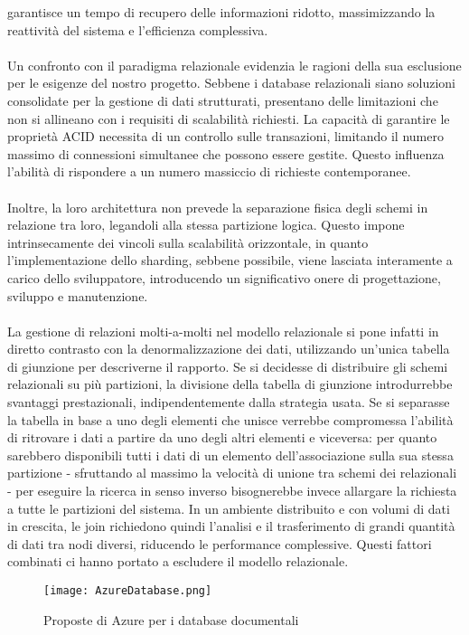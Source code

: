 garantisce un tempo di recupero delle informazioni ridotto,
massimizzando la reattività del sistema e l'efficienza complessiva.\\
\\
Un confronto con il paradigma relazionale evidenzia le ragioni
della sua esclusione per le esigenze del nostro progetto.
Sebbene i database relazionali siano soluzioni consolidate per la gestione di dati strutturati,
presentano delle limitazioni che non si allineano con i requisiti di scalabilità richiesti.
La capacità di garantire le proprietà ACID necessita 
di un controllo sulle transazioni,
limitando il numero massimo di connessioni simultanee che possono essere gestite.
Questo influenza l'abilità di rispondere a un numero massiccio di richieste contemporanee.\\
\\
Inoltre, la loro architettura non prevede la separazione fisica degli schemi in relazione tra loro,
legandoli alla stessa partizione logica.
Questo impone intrinsecamente dei vincoli sulla scalabilità orizzontale,
in quanto l'implementazione dello sharding, sebbene possibile,
viene lasciata interamente a carico dello sviluppatore,
introducendo un significativo onere di progettazione, sviluppo e manutenzione.\\
\\
La gestione di relazioni molti-a-molti nel modello relazionale
si pone infatti in diretto contrasto con la denormalizzazione dei dati,
utilizzando un'unica tabella di giunzione per descriverne il rapporto.
Se si decidesse di distribuire gli schemi relazionali su più partizioni,
la divisione della tabella di giunzione introdurrebbe svantaggi prestazionali,
indipendentemente dalla strategia usata.
Se si separasse la tabella in base a uno degli elementi che unisce
verrebbe compromessa l'abilità di ritrovare i dati a partire 
da uno degli altri elementi e viceversa:
per quanto sarebbero disponibili tutti i dati di un elemento 
dell'associazione sulla sua stessa partizione
- sfruttando al massimo la velocità di unione tra schemi dei relazionali -
per eseguire la ricerca in senso inverso bisognerebbe invece
allargare la richiesta a tutte le partizioni del sistema.
In un ambiente distribuito e con volumi di dati in crescita,
le join richiedono quindi l'analisi e il trasferimento di grandi quantità di dati tra nodi diversi,
riducendo le performance complessive.
Questi fattori combinati ci hanno portato a escludere il modello relazionale.\\
\begin{figure}[h!]
    \centering
    \texttt{[image: AzureDatabase.png]}
    \caption{Proposte di Azure per i database documentali}
\end{figure}
